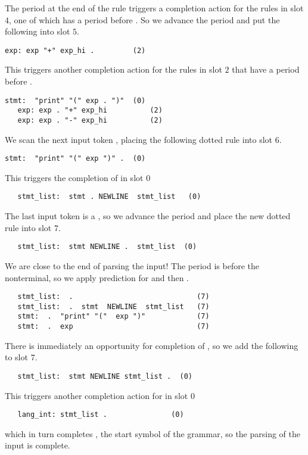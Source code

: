 \documentclass[7x10]{TimesAPriori_MIT}%
\numberwithin{theorem}{chapter}
\numberwithin{definition}{chapter}
\numberwithin{equation}{chapter}
\begin{document}
{The period at the end of the rule triggers a completion action for the
rules in slot $4$, one of which has a period before .
So we advance the period and put the following into slot $5$.
\begin{lstlisting}[escapechar=$]
   exp: exp "+" exp_hi .         (2)
\end{lstlisting}
This triggers another completion action for the rules in slot $2$ that
have a period before .
\begin{lstlisting}[escapechar=$]
   stmt:  "print" "(" exp . ")"  (0)
   exp: exp . "+" exp_hi          (2)
   exp: exp . "-" exp_hi          (2)
\end{lstlisting}

We scan the next input token , placing the following dotted
rule into slot $6$.
\begin{lstlisting}[escapechar=$]
   stmt:  "print" "(" exp ")" .  (0)
\end{lstlisting}
This triggers the completion of  in slot $0$
\begin{lstlisting}
   stmt_list:  stmt . NEWLINE  stmt_list   (0)
\end{lstlisting}
The last input token is a , so we advance the period
and place the new dotted rule into slot $7$.
\begin{lstlisting}
   stmt_list:  stmt NEWLINE .  stmt_list  (0)
\end{lstlisting}
We are close to the end of parsing the input!
The period is before the  nonterminal, so we
apply prediction for  and then .
\begin{lstlisting}
   stmt_list:  .                             (7)
   stmt_list:  .  stmt  NEWLINE  stmt_list   (7)
   stmt:  .  "print" "("  exp ")"            (7)
   stmt:  .  exp                             (7)
\end{lstlisting}
There is immediately an opportunity for completion of ,
so we add the following to slot $7$.
\begin{lstlisting}
   stmt_list:  stmt NEWLINE stmt_list .  (0)
\end{lstlisting}
This triggers another completion action for  in slot $0$
\begin{lstlisting}
   lang_int: stmt_list .               (0)
\end{lstlisting}
which in turn completes , the start symbol of the
grammar, so the parsing of the input is complete.

}
\end{document}
